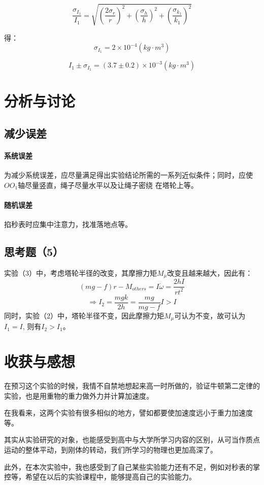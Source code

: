 \documentclass{ctexart}
\begin{document}
      $$\frac{\sigma_{I_1}}{I_1}=\sqrt{(\frac{2\sigma_r}{r})^2+(\frac{\sigma_h}{h})^2+(\frac{\sigma_{k_1}}{k_1})^2}$$

      得：$$\sigma_{I_1}=2\times10^{-4}(kg\cdot m^3)$$

      $$I_1\pm\sigma_{I_1}=(3.7\pm0.2)\times10^{-3}(kg\cdot m^3)$$
      \section{分析与讨论}
      \subsection{减少误差}
      \paragraph{系统误差}为减少系统误差，应尽量满足得出实验结论所需的一系列近似条件；同时，应使$OO_1$轴尽量竖直，绳子尽量水平以及让绳子密绕
      在塔轮上等。
      \paragraph{随机误差}掐秒表时应集中注意力，找准落地点等。
      \subsection{思考题（5）}
      实验（3）中，考虑塔轮半径的改变，其摩擦力矩$M_{\mu}$改变且越来越大，因此有：
      $$(mg-f)r-M_{others}=I\dot\omega=\frac{2hI}{rt^2}$$
      $$\Rightarrow I_2=\frac{mgk}{2h}=\frac{mg}{mg-f}I>I$$
      同时，实验（2）中，塔轮半径不变，因此摩擦力矩$M_{\mu}$可认为不变，故可认为$I_1=I$,
      则有$I_2>I_1$。
      \section{收获与感想}
      在预习这个实验的时候，我情不自禁地想起来高一时所做的，验证牛顿第二定律的实验，也是用重物的重力做外力并计算加速度。

      在我看来，这两个实验有很多相似的地方，譬如都要使加速度远小于重力加速度等。

      其实从实验研究的对象，也能感受到高中与大学所学习内容的区别，从可当作质点运动的整体平动，到刚体的转动，我们所学习的物理也更加高深了。

      此外，在本次实验中，我也感受到了自己某些实验能力还有不足，例如对秒表的掌控等，希望在以后的实验课程中，能够提高自己的实验能力。
\end{document}
